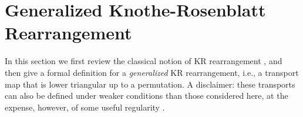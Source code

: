 \documentclass[twoside,11pt]{article}
\begin{document}
%
%
%
%
%
%
%
%
%

%
%
%
%
%
%
%
%
    
%
%
%
%
%
%
%
%
%
%
%
%
%
%
%
%
%
%
%

%
%
%

%

%
%
%
%

%
%
%

%
%

%
%
%


%
%
%
%
%
%
%
%
%






%


%
%

%

\appendix

\section{Generalized Knothe-Rosenblatt Rearrangement}
\label{sec:genKR}
%
%
%
%
%
%
%
%
%
%
In this section we first review the classical
notion of KR rearrangement 
\citep{rosenblatt1952remarks}, %
%
%
%
and
%
%
then give a formal
definition for a  {\it generalized} KR rearrangement, i.e.,
a transport map that is lower triangular up
to a permutation.
A disclaimer: these transports can also be defined
under  weaker conditions than those
considered here, at the expense, however, of
some useful regularity \citep{bogachev2005triangular}.
%
%
%
%
%
%
%

%
%

%
\end{document}
